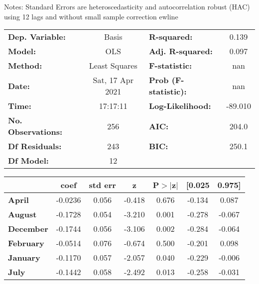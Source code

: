Notes: \newline
 [1] Standard Errors are heteroscedasticity and autocorrelation robust (HAC) using 12 lags and without small sample correction
ewline\begin{center}
\begin{tabular}{lclc}
\toprule
\textbf{Dep. Variable:}    &      Basis       & \textbf{  R-squared:         } &     0.139   \\
\textbf{Model:}            &       OLS        & \textbf{  Adj. R-squared:    } &     0.097   \\
\textbf{Method:}           &  Least Squares   & \textbf{  F-statistic:       } &       nan   \\
\textbf{Date:}             & Sat, 17 Apr 2021 & \textbf{  Prob (F-statistic):} &      nan    \\
\textbf{Time:}             &     17:17:11     & \textbf{  Log-Likelihood:    } &   -89.010   \\
\textbf{No. Observations:} &         256      & \textbf{  AIC:               } &     204.0   \\
\textbf{Df Residuals:}     &         243      & \textbf{  BIC:               } &     250.1   \\
\textbf{Df Model:}         &          12      & \textbf{                     } &             \\
\bottomrule
\end{tabular}
\begin{tabular}{lcccccc}
                   & \textbf{coef} & \textbf{std err} & \textbf{z} & \textbf{P$> |$z$|$} & \textbf{[0.025} & \textbf{0.975]}  \\
\midrule
\textbf{April}     &      -0.0236  &        0.056     &    -0.418  &         0.676        &       -0.134    &        0.087     \\
\textbf{August}    &      -0.1728  &        0.054     &    -3.210  &         0.001        &       -0.278    &       -0.067     \\
\textbf{December}  &      -0.1744  &        0.056     &    -3.106  &         0.002        &       -0.284    &       -0.064     \\
\textbf{February}  &      -0.0514  &        0.076     &    -0.674  &         0.500        &       -0.201    &        0.098     \\
\textbf{January}   &      -0.1170  &        0.057     &    -2.057  &         0.040        &       -0.229    &       -0.006     \\
\textbf{July}      &      -0.1442  &        0.058     &    -2.492  &         0.013        &       -0.258    &       -0.031     \\

\end{tabular}
\end{center}
